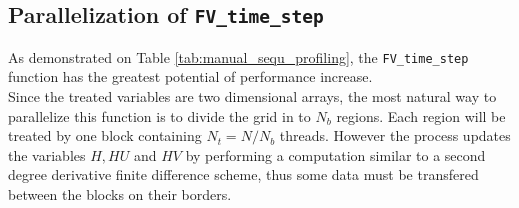 \documentclass{article}
\begin{document}
\subsection{Parallelization of \texttt{FV\_time\_step}} 
As demonstrated on Table \ref{tab:manual_sequ_profiling}, the \texttt{FV\_time\_step} function has the greatest potential of performance increase.\\ Since the treated variables are two dimensional arrays, the most natural way to parallelize this function is to divide the grid in to $N_b$ regions. Each region will be treated by one block containing $N_t=N/N_b$ threads.
However the process updates the variables $H,HU$ and $HV$ by performing a computation similar to a second degree derivative finite difference scheme, thus some data must be transfered between the blocks on their borders.

\end{document}

